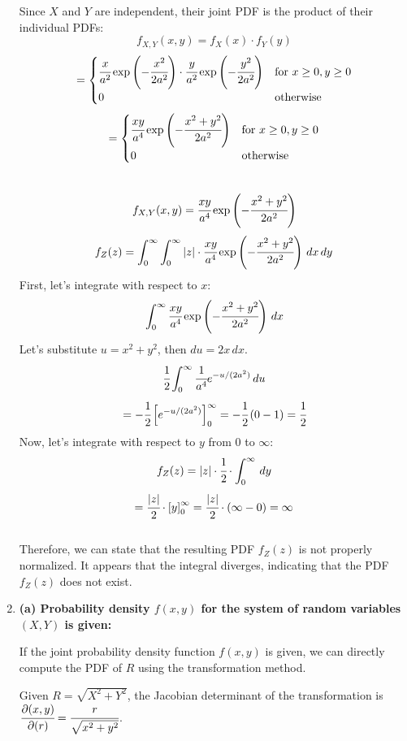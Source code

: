 \documentclass{article}
\begin{document}
\begin{enumerate}
    Since \( X \) and \( Y \) are independent, their joint PDF is the product of their individual PDFs:
    \[ 
        f_{X,Y}(x, y) = f_X(x) \cdot f_Y(y) 
    \]
    \[ 
        = \begin{cases} \cfrac{x}{a^2} \exp\left(-\cfrac{x^2}{2a^2}\right) \cdot \cfrac{y}{a^2} \exp\left(-\cfrac{y^2}{2a^2}\right) & \text{for } x \geq 0, y \geq 0 \\ 0 & \text{otherwise} \end{cases}
    \]
    \[ 
        = \begin{cases} \cfrac{xy}{a^4} \exp\left(-\cfrac{x^2 + y^2}{2a^2}\right) & \text{for } x \geq 0, y \geq 0 \\ 0 & \text{otherwise} \end{cases} 
    \]\\
    \[ 
        f_{X,Y}(x, y) = \cfrac{xy}{a^4} \exp\left(-\cfrac{x^2 + y^2}{2a^2}\right)
    \]
    \[ 
        f_Z(z) = \int_{0}^{\infty} \int_{0}^{\infty} |z| \cdot \cfrac{xy}{a^4} \exp\left(-\cfrac{x^2 + y^2}{2a^2}\right) \,dx \,dy
    \]
    First, let's integrate with respect to \( x \):
    \[ 
        \int_{0}^{\infty} \cfrac{xy}{a^4} \exp\left(-\cfrac{x^2 + y^2}{2a^2}\right) \,dx
    \]
    Let's substitute \( u = x^2 + y^2 \), then \( du = 2x \,dx \).
    \[ 
        \cfrac{1}{2} \int_{0}^{\infty} \cfrac{1}{a^4} e^{-u/(2a^2)} \,du 
    \]
    \[ 
        = -\cfrac{1}{2} \left[ e^{-u/(2a^2)} \right]_{0}^{\infty} = -\cfrac{1}{2} \left(0 - 1\right) = \cfrac{1}{2} 
    \]
    Now, let's integrate with respect to \( y \) from 0 to \( \infty \):
    \[ 
        f_Z(z) = |z| \cdot \cfrac{1}{2} \cdot \int_{0}^{\infty} \,dy
    \]
    \[ 
        = \cfrac{|z|}{2} \cdot \left[y\right]_{0}^{\infty} = \cfrac{|z|}{2} \cdot \left(\infty - 0\right) = \infty
    \]\\
    Therefore, we can state that the resulting PDF \( f_Z(z) \) is not properly normalized. It appears that the integral diverges, indicating that the PDF \( f_Z(z) \) does not exist.

\newpage
\item
    \textbf{(a) Probability density $f(x, y)$ for the system of random variables $(X, Y)$ is given:}

    If the joint probability density function $f(x, y)$ is given, we can directly compute the PDF of $R$ using the transformation method.

    Given $R = \sqrt{X^2 + Y^2}$, the Jacobian determinant of the transformation is $\cfrac{\partial(x, y)}{\partial(r)} = \cfrac{r}{\sqrt{x^2 + y^2}}$.


\end{enumerate}
\end{document}
